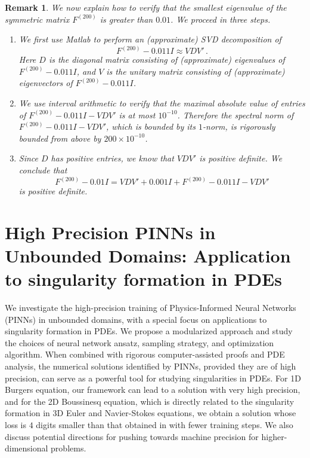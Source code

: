 \documentclass[12pt]{caltech_thesis}
\newtheorem{remark}[theorem]{Remark}
\numberwithin{equation}{section}
\begin{document}
\begin{remark}
    We now explain how to verify that the smallest eigenvalue of the symmetric matrix $F^{(200)}$ is greater than $0.01$. We proceed in three steps.
    \begin{enumerate}
        \item We first use Matlab to perform an (approximate) SVD decomposition of $$F^{(200)}-0.011I\approx VDV'\,.$$
        Here $D$ is the diagonal matrix consisting of (approximate) eigenvalues of $F^{(200)}-0.011I$, and $V$ is the unitary matrix consisting of (approximate) eigenvectors of $F^{(200)}-0.011I$.
        \item We use interval arithmetic to verify that the maximal absolute value of entries of $F^{(200)}-0.011I- VDV'$ is at most $10^{-10}$. Therefore the spectral norm of $F^{(200)}-0.011I- VDV'$, which is bounded by its $1$-norm, is rigorously bounded from above by $200 \times 10^{-10}$.
        \item Since $D$ has positive entries, we know that $VDV'$ is positive definite. We  conclude that  $$F^{(200)}-0.01I=VDV'+0.001I+F^{(200)}-0.011I- VDV'$$ is positive definite.
    \end{enumerate}
\end{remark}


\chapter{High Precision PINNs in Unbounded Domains: Application to singularity formation in PDEs}
\label{append:pinns}
We investigate the high-precision training of Physics-Informed Neural Networks (PINNs) in unbounded domains, 
with a special focus on applications to singularity formation in PDEs. 
We propose a modularized approach and study the choices of neural network ansatz, sampling strategy, and optimization algorithm.
When combined with rigorous computer-assisted proofs and PDE analysis,
the numerical solutions identified by PINNs, provided they are of high precision, 
can serve as a powerful tool for studying singularities in PDEs.
For 1D Burgers equation, our framework can lead to a solution with very high precision,
 and for the 2D Boussinesq equation, which is directly related 
 to the singularity formation in 3D Euler and Navier-Stokes equations, 
 we obtain a solution whose loss is $4$ digits smaller than that obtained in \cite{wang2023asymptotic} with fewer training steps. 
  We also discuss potential directions for pushing towards machine precision for higher-dimensional problems.
\end{document}
